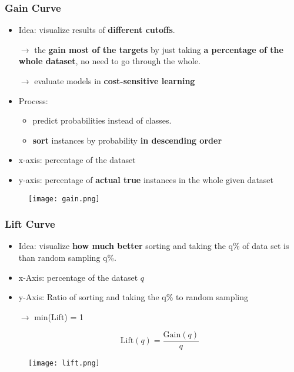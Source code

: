 \subsubsection{Gain Curve}
\begin{itemize}
	\item Idea: visualize results of \textbf{different cutoffs}.
	
	$\rightarrow$ the \textbf{gain most of the targets} by just taking \textbf{a percentage of the whole dataset}, no need to go through the whole.
	
	$\rightarrow$ evaluate models in \textbf{cost-sensitive learning}
	\item Process:
	\begin{itemize}
		\item predict probabilities instead of classes.
		\item \textbf{sort} instances by probability \textbf{in descending order}	
	\end{itemize}
	\item x-axis: percentage of the dataset 
	\item y-axis: percentage of \textbf{actual true} instances in the whole given dataset
\end{itemize}
\begin{figure}[H]
	\centering
	\texttt{[image: gain.png]}
\end{figure}
\subsubsection{Lift Curve}
\begin{itemize}
	\item Idea: visualize \textbf{how much better} sorting and taking the q\% of data set is than random sampling q\%.
	
	\item x-Axis: percentage of the dataset $q$
	\item y-Axis: Ratio of sorting and taking the q\% to random sampling 
		
	$\rightarrow$ min(Lift) = 1
		
	$$\text{Lift}(q) = \frac{\text{Gain}(q)}{q}$$

\end{itemize}
\begin{figure}[H]
	\centering
	\texttt{[image: lift.png]}
\end{figure}
